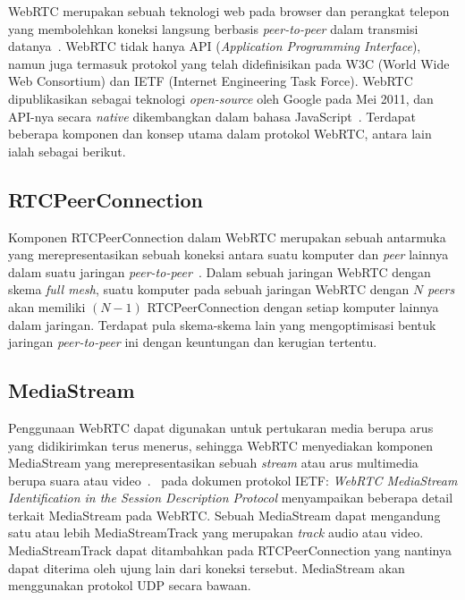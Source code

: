 WebRTC merupakan sebuah teknologi web pada browser dan perangkat telepon yang membolehkan koneksi langsung berbasis \textit{peer-to-peer} dalam transmisi datanya~\citep{rfc8835}. WebRTC tidak hanya API (\textit{Application Programming Interface}), namun juga termasuk protokol yang telah didefinisikan pada W3C (World Wide Web Consortium) dan IETF (Internet Engineering Task Force). WebRTC dipublikasikan sebagai teknologi \textit{open-source} oleh Google pada Mei 2011, dan API-nya secara \textit{native} dikembangkan dalam bahasa JavaScript~\citep{dutton2012getting}. Terdapat beberapa komponen dan konsep utama dalam protokol WebRTC, antara lain ialah sebagai berikut.

\subsection{RTCPeerConnection}

Komponen RTCPeerConnection dalam WebRTC merupakan sebuah antarmuka yang merepresentasikan sebuah koneksi antara suatu komputer dan \textit{peer} lainnya dalam suatu jaringan \textit{peer-to-peer}~\citep{rfc8835, rfc8834, jennings2013real}. Dalam sebuah jaringan WebRTC dengan skema \textit{full mesh}, suatu komputer pada sebuah jaringan WebRTC dengan $N$ \textit{peers} akan memiliki $(N-1)$ RTCPeerConnection dengan setiap komputer lainnya dalam jaringan. Terdapat pula skema-skema lain yang mengoptimisasi bentuk jaringan \textit{peer-to-peer} ini dengan keuntungan dan kerugian tertentu.

\subsection{MediaStream}

Penggunaan WebRTC dapat digunakan untuk pertukaran media berupa arus yang didikirimkan terus menerus, sehingga WebRTC menyediakan komponen MediaStream yang merepresentasikan sebuah \textit{stream} atau arus multimedia berupa suara atau video~\citep{sredojev2015webrtc, rfc8835}.~\cite{rfc8830} pada dokumen protokol IETF: \textit{WebRTC MediaStream Identification in the Session Description Protocol} menyampaikan beberapa detail terkait MediaStream pada WebRTC. Sebuah MediaStream dapat mengandung satu atau lebih MediaStreamTrack yang merupakan \textit{track} audio atau video. MediaStreamTrack dapat ditambahkan pada RTCPeerConnection yang nantinya dapat diterima oleh ujung lain dari koneksi tersebut. MediaStream akan menggunakan protokol UDP secara bawaan.

